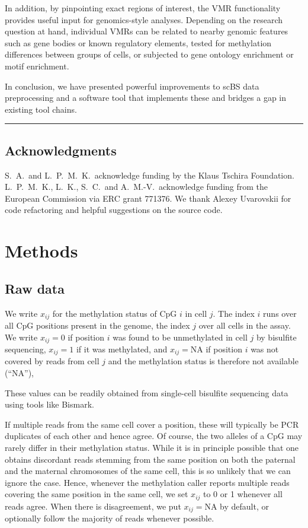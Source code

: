 \documentclass[twocolumn,10pt]{article}
\begin{document}
In addition, by pinpointing exact regions of interest, the VMR functionality provides useful input for genomics-style analyses.
Depending on the research question at hand, individual VMRs can be related to nearby genomic features such as gene bodies or known regulatory elements, tested for methylation differences between groups of cells, or subjected to gene ontology enrichment or motif enrichment.

In conclusion, we have presented powerful improvements to scBS data preprocessing and a software tool that implements these and bridges a gap in existing tool chains.


\vspace{1.4ex}
\noindent\hfil\rule{.6\columnwidth}{.2pt}\hfil

\subsection{Acknowledgments}

S.\ A.\ and L.\ P.\ M.\ K.\ acknowledge funding by the Klaus Tschira Foundation.
L.\ P.\ M.\ K., L.\ K., S.\ C.\ and A.\ M.-V.\ acknowledge funding from the European Commission via ERC grant 771376.
We thank Alexey Uvarovskii for code refactoring and helpful suggestions on the source code.

\section{Methods}

\subsection{Raw data}

We write $x_{ij}$ for the methylation status of CpG $i$ in cell $j$.
The index $i$ runs over all CpG positions present in the genome, the index $j$ over all cells in the assay.
We write $x_{ij}=0$ if position $i$ was found to be unmethylated in cell $j$ by bisulfite sequencing, $x_{ij}=1$ if it was methylated, and $x_{ij}=\text{NA}$ if position $i$ was not covered by reads from cell $j$ and the methylation status is therefore not available (``NA''),

These values can be readily obtained from single-cell bisulfite sequencing data using tools like Bismark.

If multiple reads from the same cell cover a position, these will typically be PCR duplicates of each other and hence agree.
Of course, the two alleles of a CpG may rarely differ in their methylation status.
While it is in principle possible that one obtains discordant reads stemming from the same position on both the paternal and the maternal chromosomes of the same cell, this is so unlikely that we can ignore the case.
Hence, whenever the methylation caller reports multiple reads covering the same position in the same cell, we set $x_{ij}$ to 0 or 1 whenever all reads agree.
When there is disagreement, we put $x_{ij}=\text{NA}$ by default, or optionally follow the majority of reads whenever possible.
\end{document}
